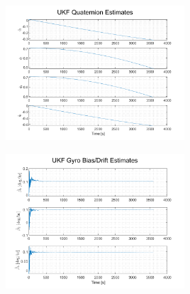 \documentclass[12pt]{report}
\begin{document}
\begin{figure}[h!]
	\centering
	\begin{minipage}{.5\textwidth}
		\centering
		\includegraphics[height=5cm, keepaspectratio]{ukfQuatEst.png}
		\label{fig:ex1}
	\end{minipage}%
	\begin{minipage}{.5\textwidth}
		\centering
		\includegraphics[height=5cm, keepaspectratio]{ukfBiasEst.png}
		\label{fig:ex2}
	\end{minipage}
\end{figure}
\end{document}
